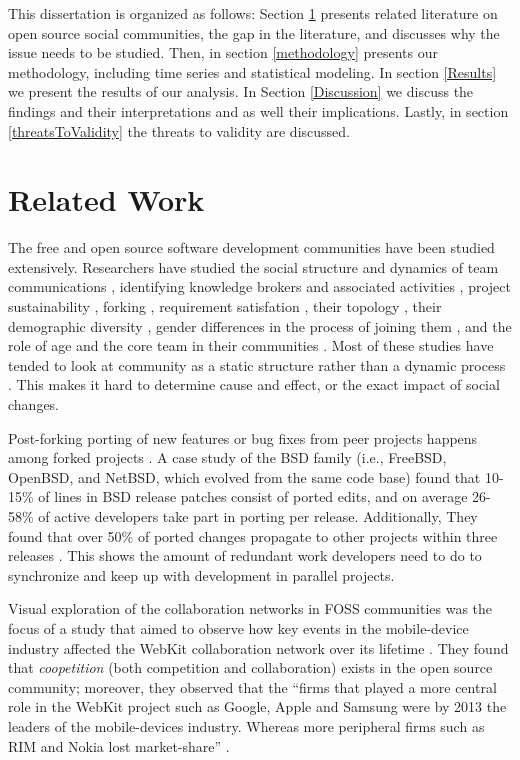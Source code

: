 \documentclass[12pt,letterpaper]{gthesis2}  %
\begin{document}
This dissertation is organized as follows: Section \ref{relatedwork} presents related literature on open source social communities, the gap in the literature, and discusses why the issue needs to be studied. Then, in section \ref{methodology} presents our methodology, including time series and statistical modeling. In section \ref{Results} we present the results of our analysis. In Section \ref{Discussion} we discuss the findings and their interpretations and as well their implications. Lastly, in section \ref{threatsToValidity} the threats to validity are discussed.

\section{Related Work}
\label{relatedwork}

The free and open source software development communities have been studied extensively. Researchers have studied the social structure and dynamics of team communications \cite{Bird}\cite{Guzzi}\cite{HowisonSocialDynamics}\cite{HowisonFlossMole}\cite{Nakakoji}, identifying knowledge brokers and associated activities \cite{Sowe}, project sustainability \cite{Nakakoji}\cite{NymanForkingSustainability}, forking \cite{NymanCodeForking}, requirement satisfation \cite{Ernst}, their topology \cite{Bird}, their demographic diversity \cite{Kunegis}, gender differences in the process of joining them \cite{Kuechler}, and the role of age and the core team in their communities \cite{AzarbakhtOSS2014}\cite{AzarbakhtINSNA2014}\cite{DavidsonVLHCC2014}\cite{Torres}. Most of these studies have tended to look at community as a static structure rather than a dynamic process \cite{CrowstonFLOSSWhatWeKnow}. This makes it hard to determine cause and effect, or the exact impact of social changes.

Post-forking porting of new features or bug fixes from peer projects happens among forked projects \cite{Baishakhi}. A case study of the BSD family (i.e., FreeBSD, OpenBSD, and NetBSD, which evolved from the same code base) found that 10-15\% of lines in BSD release patches consist of ported edits, and on average 26-58\% of active developers take part in porting per release. Additionally, They found that over 50\% of ported changes propagate to other projects within three releases \cite{Baishakhi}. This shows the amount of redundant work developers need to do to synchronize and keep up with development in parallel projects. 

Visual exploration of the collaboration networks in FOSS communities was the focus of a study that aimed to observe how key events in the mobile-device industry affected the WebKit collaboration network over its lifetime \cite{JoseWebKit}. They found that \textit{coopetition} (both competition and collaboration) exists in the open source community; moreover, they observed that the ``firms that played a more central role in the WebKit project such as Google, Apple and Samsung were by 2013 the leaders of the mobile-devices industry. Whereas more peripheral firms such as RIM and Nokia lost market-share'' \cite{JoseWebKit}. 
\end{document}
